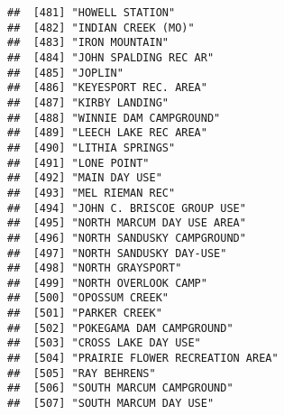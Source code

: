 \documentclass[
]{article}
\begin{document}
\begin{verbatim}
##  [481] "HOWELL STATION"                                                                      
##  [482] "INDIAN CREEK (MO)"                                                                   
##  [483] "IRON MOUNTAIN"                                                                       
##  [484] "JOHN SPALDING REC AR"                                                                
##  [485] "JOPLIN"                                                                              
##  [486] "KEYESPORT REC. AREA"                                                                 
##  [487] "KIRBY LANDING"                                                                       
##  [488] "WINNIE DAM CAMPGROUND"                                                               
##  [489] "LEECH LAKE REC AREA"                                                                 
##  [490] "LITHIA SPRINGS"                                                                      
##  [491] "LONE POINT"                                                                          
##  [492] "MAIN DAY USE"                                                                        
##  [493] "MEL RIEMAN REC"                                                                      
##  [494] "JOHN C. BRISCOE GROUP USE"                                                           
##  [495] "NORTH MARCUM DAY USE AREA"                                                           
##  [496] "NORTH SANDUSKY CAMPGROUND"                                                           
##  [497] "NORTH SANDUSKY DAY-USE"                                                              
##  [498] "NORTH GRAYSPORT"                                                                     
##  [499] "NORTH OVERLOOK CAMP"                                                                 
##  [500] "OPOSSUM CREEK"                                                                       
##  [501] "PARKER CREEK"                                                                        
##  [502] "POKEGAMA DAM CAMPGROUND"                                                             
##  [503] "CROSS LAKE DAY USE"                                                                  
##  [504] "PRAIRIE FLOWER RECREATION AREA"                                                      
##  [505] "RAY BEHRENS"                                                                         
##  [506] "SOUTH MARCUM CAMPGROUND"                                                             
##  [507] "SOUTH MARCUM DAY USE"                                                                

\end{verbatim}
\end{document}
